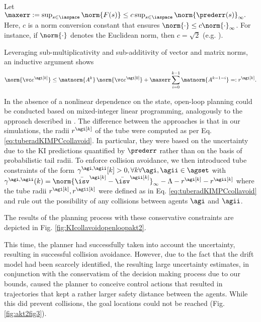 Let $\maxerr := \sup_{s \in \iaspace} \norm{F(s)} \leq c \sup_{s \in \iaspace} \norm{\prederr(s)}_\infty.$
%
Here, $c$ is a norm conversion constant that ensures
 $\norm{\cdot } \leq c \norm{\cdot}_\infty$. For instance, if $\norm{\cdot}$ denotes the Euclidean norm, then $c = \sqrt 2$ (e.g. \cite{koenigsberger:2000}).

Leveraging sub-multiplicativity and sub-additivity of vector and matrix norms, an inductive argument shows 
%
\begin{eqnarray} \label{eq:tuberadKIMPCcollavoid}
	\norm{\vc e^\agi[k]} \leq \matnorm{A^{k}} \, \norm{\vc e^\agi[0]} +  \maxerr	 \sum_{i=0}^{k-1} \matnorm{A^{k-1-i}} =: r^\agi[k].
\end{eqnarray}

%

In the absence of a nonlinear dependence on the state, open-loop planning could be conducted based on mixed-integer linear programming, analogously to the approach described in \cite{Lyons2011}. The difference between the approaches is that in our simulations, the radii $r^\agi[k]$ of the tube were computed as per Eq. \ref{eq:tuberadKIMPCcollavoid}. In particular, they were based on the uncertainty due to the KI predictions quantified by $\prederr$ rather than on the basis of probabilistic tail radii. To enforce collision avoidance, we then introduced tube constraints of the form $\gamma^{\agi,\agii}[k] > 0, \forall k \forall \agi,\agii \in \agset$ with 
$\gamma^{\agi,\agii}(k) = \norm{\bar \isv^\agi[k] - \bar \isv^\agii[k] }_\infty - \Lambda - r^\agi[k] - r^\agii[k] $ where the tube radii $r^\agi[k], r^\agii[k]$ were defined as in Eq. \ref{eq:tuberadKIMPCcollavoid} and rule out the possibility of any collisions between agents $\agi$ and $\agii$.

The results of the planning process with these conservative constraints are depicted in Fig. \ref{fig:KIcollavoidopenloopakt2}.


This time, the planner had successfully taken into account the uncertainty, resulting in successful collision avoidance. However, due to the fact that the drift model had been scarcely identified, the resulting large uncertainty estimates, in conjunction with the conservatism of the decision making process due to our bounds, caused the planner to conceive control actions that resulted in trajectories that kept a rather larger safety distance between the agents. While this did prevent collisions, the goal locations could not be reached (Fig. \ref{fig:akt2fig3}).


